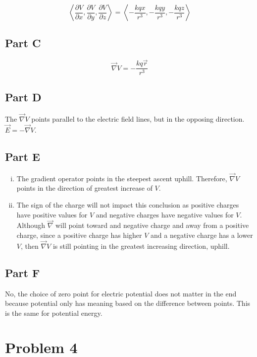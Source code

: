 \documentclass{article}
\begin{document}
$$ \left\langle \frac{ \partial V }{ \partial x }, \frac{ \partial V }{ \partial
y}, \frac{ \partial V }{ \partial z } \right\rangle = \left\langle -\frac{ kqx
}{ r^{3} }, -\frac{ kqy }{ r^{3} }, -\frac{ kqz }{ r^{3} } \right\rangle$$

\subsection*{Part C}

$$ \vec{\nabla} V = -\frac{ kq\vec{r} }{ r^{3} }$$

\subsection*{Part D}

The $\vec{\nabla} V$ points parallel to the electric field lines, but in the
opposing direction. $\vec{E} = -\vec{\nabla} V$.

\subsection*{Part E}

\begin{enumerate}[i.]
  \item The gradient operator points in the steepest ascent uphill. Therefore,
    $\vec{\nabla} V$ points in the direction of greatest increase of $V$.

  \item The sign of the charge will not impact this conclusion as positive
    charges have positive values for $V$ and negative charges have negative
    values for $V$. Although $\vec{\nabla}$ will point toward and negative
    charge and away from a positive charge, since a positive charge has higher
    $V$ and a negative charge has a lower $V$, then $\vec{\nabla} V$ is still
    pointing in the greatest increasing direction, uphill.

\end{enumerate}

\subsection*{Part F}

No, the choice of zero point for electric potential does not matter in the end
because potential only has meaning based on the difference between points. This
is the same for potential energy.

\section*{Problem 4}
\end{document}
